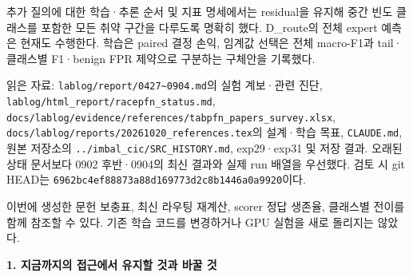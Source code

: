 추가 질의에 대한 학습·추론 순서 및 지표 명세에서는 residual을 유지해 중간 빈도 클래스를 포함한 모든 취약 구간을 다루도록 명확히 했다. D\_\allowbreak{}route의 전체 expert 예측은 현재도 수행한다. 학습은 paired 결정 손익, 임계값 선택은 전체 macro-F1과 tail·클래스별 F1·benign FPR 제약으로 구분하는 구체안을 기록했다.

읽은 자료: \texttt{lablog/\allowbreak{}\allowbreak{}r\allowbreak{}eport/\allowbreak{}\allowbreak{}04\allowbreak{}27\textasciitilde{}0904.\allowbreak{}md}의 실험 계보·관련 진단, \texttt{lablog/\allowbreak{}\allowbreak{}h\allowbreak{}tml\_\allowbreak{}\allowbreak{}repo\allowbreak{}rt/\allowbreak{}\allowbreak{}racep\allowbreak{}fn\_\allowbreak{}\allowbreak{}statu\allowbreak{}s.\allowbreak{}md}, \texttt{docs/\allowbreak{}\allowbreak{}lab\allowbreak{}log/\allowbreak{}\allowbreak{}evid\allowbreak{}ence/\allowbreak{}\allowbreak{}ref\allowbreak{}erences/\allowbreak{}\allowbreak{}tabpfn\_\allowbreak{}\allowbreak{}p\allowbreak{}apers\_\allowbreak{}\allowbreak{}su\allowbreak{}rvey.\allowbreak{}xls\allowbreak{}x}, \texttt{docs/\allowbreak{}\allowbreak{}lab\allowbreak{}log/\allowbreak{}\allowbreak{}repo\allowbreak{}rts/\allowbreak{}\allowbreak{}2026\allowbreak{}1020\_\allowbreak{}\allowbreak{}ref\allowbreak{}erences.\allowbreak{}tex}의 설계·학습 목표, \texttt{CLAUDE.\allowbreak{}m\allowbreak{}d}, 원본 저장소의 \texttt{.\allowbreak{}.\allowbreak{}/\allowbreak{}\allowbreak{}imbal\allowbreak{}\_\allowbreak{}\allowbreak{}cic/\allowbreak{}\allowbreak{}SRC\allowbreak{}\_\allowbreak{}\allowbreak{}HISTORY\allowbreak{}.\allowbreak{}md}, exp29·exp31 및 저장 결과. 오래된 상태 문서보다 0902 후반·0904의 최신 결과와 실제 run 배열을 우선했다. 검토 시 git HEAD는 \texttt{6962bc4e\allowbreak{}f88873a8\allowbreak{}8d169773\allowbreak{}d2c8b144\allowbreak{}6a0a9920\allowbreak{}}이다.

이번에 생성한 문헌 보충표, 최신 라우팅 재계산, scorer 정답 생존율, 클래스별 전이를 함께 참조할 수 있다. 기존 학습 코드를 변경하거나 GPU 실험을 새로 돌리지는 않았다.

\textbf{1. 지금까지의 접근에서 유지할 것과 바꿀 것}

